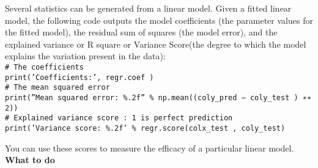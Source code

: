 \documentclass[letter-paper,12pt]{article} %
\begin{document}
Several statistics can be generated from a linear model. Given a fitted linear model, the following code outputs the model coefficients (the parameter values for the fitted model), the residual sum of squares (the model error), and the explained variance or R square or Variance Score(the degree to which the model explains the variation present in the data):\\

\texttt{\# The coefficients\\
print(’Coefficients:’, regr.coef )\\ 
\# The mean squared error\\
print(”Mean squared error: \%.2f” \% np.mean((coly\_pred − coly\_test ) ∗∗ 2))\\
\# Explained variance score : 1 is perfect prediction\\
print(’Variance score: \%.2f’ \% regr.score(colx\_test , coly\_test)\\
}

You can use these scores to measure the efficacy of a particular linear model.\\

\textbf{What to do }\\
\end{document}
